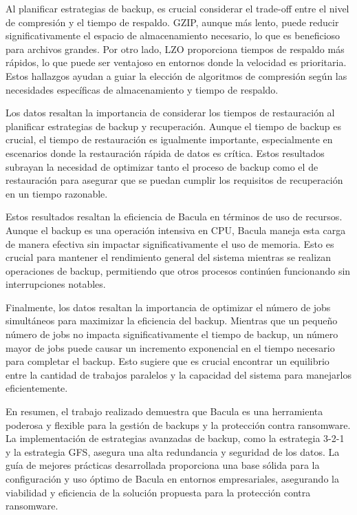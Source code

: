Al planificar estrategias de backup, es crucial considerar el trade-off entre el nivel de compresión y el tiempo de respaldo. GZIP, aunque más lento, puede reducir significativamente el espacio de almacenamiento necesario, lo que es beneficioso para archivos grandes. Por otro lado, LZO proporciona tiempos de respaldo más rápidos, lo que puede ser ventajoso en entornos donde la velocidad es prioritaria. Estos hallazgos ayudan a guiar la elección de algoritmos de compresión según las necesidades específicas de almacenamiento y tiempo de respaldo.

Los datos resaltan la importancia de considerar los tiempos de restauración al planificar estrategias de backup y recuperación. Aunque el tiempo de backup es crucial, el tiempo de restauración es igualmente importante, especialmente en escenarios donde la restauración rápida de datos es crítica. Estos resultados subrayan la necesidad de optimizar tanto el proceso de backup como el de restauración para asegurar que se puedan cumplir los requisitos de recuperación en un tiempo razonable.

Estos resultados resaltan la eficiencia de Bacula en términos de uso de recursos. Aunque el backup es una operación intensiva en CPU, Bacula maneja esta carga de manera efectiva sin impactar significativamente el uso de memoria. Esto es crucial para mantener el rendimiento general del sistema mientras se realizan operaciones de backup, permitiendo que otros procesos continúen funcionando sin interrupciones notables.

Finalmente, los datos resaltan la importancia de optimizar el número de jobs simultáneos para maximizar la eficiencia del backup. Mientras que un pequeño número de jobs no impacta significativamente el tiempo de backup, un número mayor de jobs puede causar un incremento exponencial en el tiempo necesario para completar el backup. Esto sugiere que es crucial encontrar un equilibrio entre la cantidad de trabajos paralelos y la capacidad del sistema para manejarlos eficientemente.

En resumen, el trabajo realizado demuestra que Bacula es una herramienta poderosa y flexible para la gestión de backups y la protección contra ransomware. La implementación de estrategias avanzadas de backup, como la estrategia 3-2-1 y la estrategia GFS, asegura una alta redundancia y seguridad de los datos. La guía de mejores prácticas desarrollada proporciona una base sólida para la configuración y uso óptimo de Bacula en entornos empresariales, asegurando la viabilidad y eficiencia de la solución propuesta para la protección contra ransomware.




